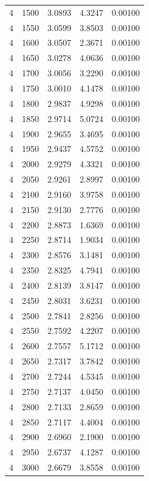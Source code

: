 \begin{longtable}{ccccc}
    4 & 1500 & 3.0893 & 4.3247 & 0.00100 \\
    4 & 1550 & 3.0599 & 3.8503 & 0.00100 \\
    4 & 1600 & 3.0507 & 2.3671 & 0.00100 \\
    4 & 1650 & 3.0278 & 4.0636 & 0.00100 \\
    4 & 1700 & 3.0056 & 3.2290 & 0.00100 \\
    4 & 1750 & 3.0010 & 4.1478 & 0.00100 \\
    4 & 1800 & 2.9837 & 4.9298 & 0.00100 \\
    4 & 1850 & 2.9714 & 5.0724 & 0.00100 \\
    4 & 1900 & 2.9655 & 3.4695 & 0.00100 \\
    4 & 1950 & 2.9437 & 4.5752 & 0.00100 \\
    4 & 2000 & 2.9279 & 4.3321 & 0.00100 \\
    4 & 2050 & 2.9261 & 2.8997 & 0.00100 \\
    4 & 2100 & 2.9160 & 3.9758 & 0.00100 \\
    4 & 2150 & 2.9130 & 2.7776 & 0.00100 \\
    4 & 2200 & 2.8873 & 1.6369 & 0.00100 \\
    4 & 2250 & 2.8714 & 1.9034 & 0.00100 \\
    4 & 2300 & 2.8576 & 3.1481 & 0.00100 \\
    4 & 2350 & 2.8325 & 4.7941 & 0.00100 \\
    4 & 2400 & 2.8139 & 3.8147 & 0.00100 \\
    4 & 2450 & 2.8031 & 3.6231 & 0.00100 \\
    4 & 2500 & 2.7841 & 2.8256 & 0.00100 \\
    4 & 2550 & 2.7592 & 4.2207 & 0.00100 \\
    4 & 2600 & 2.7557 & 5.1712 & 0.00100 \\
    4 & 2650 & 2.7317 & 3.7842 & 0.00100 \\
    4 & 2700 & 2.7244 & 4.5345 & 0.00100 \\
    4 & 2750 & 2.7137 & 4.0450 & 0.00100 \\
    4 & 2800 & 2.7133 & 2.8659 & 0.00100 \\
    4 & 2850 & 2.7117 & 4.4004 & 0.00100 \\
    4 & 2900 & 2.6960 & 2.1900 & 0.00100 \\
    4 & 2950 & 2.6737 & 4.1287 & 0.00100 \\
    4 & 3000 & 2.6679 & 3.8558 & 0.00100 \\

\end{longtable}
